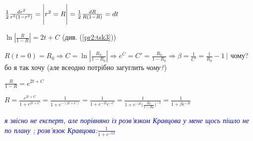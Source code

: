 $\frac{1}{2}\frac{dr^2}{r^2(1-r^2)} = \Bigg{|} r^2 = R \Bigg{|} = \frac{1}{2}\frac{dR}{R(1-R)} = dt$ 

$\ln |\frac{R}{1-R}| = 2t + C$ (див. (\ref{pr2:tsk3}))

$R(t= 0) = R_0 \Longrightarrow C = \ln|\frac{R_0}{1-R_0}| \Longrightarrow e^C =  C' = \frac{R_0}{1-R_0} \Longrightarrow \beta = \frac{1}{C'} = \frac{1}{R_0} - 1 \ \Bigg |$ чому? бо я так хочу (але всеодно потрібно загуглить \textit{чому?})


$\frac{R}{1-R} = e^{2t + C}$

$R = \frac{e^{2t + C}}{1+e^{2t + C}} = \frac{1}{1+e^{-(2t+C)}} = \frac{1}{1+e^{-2t} e^{-C}} = \frac{1}{1+e^{-2t} \big(\frac{R_0}{1-R_0}\big)^{-1}}
= \frac{1}{1+\beta e^{-2t} }$

\textcolor{blue}{\textit{я звісно не експерт, але порівняно із розв'язком Кравцова у мене щось пішло не по плану ; розв'язок Кравцова:$ \frac{1}{1+e^{-t\beta}}$}}